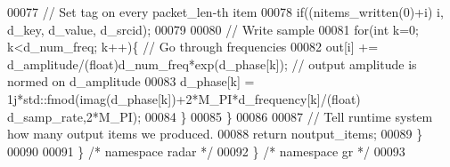 \begin{DoxyCode}
00077             \textcolor{comment}{// Set tag on every packet\_len-th item}
00078             \textcolor{keywordflow}{if}((nitems\_written(0)+i)%
      i, d_key, d_value, d_srcid);
00079             
00080             \textcolor{comment}{// Write sample}
00081             \textcolor{keywordflow}{for}(\textcolor{keywordtype}{int} k=0; k<d_num_freq; k++)\{ \textcolor{comment}{// Go through frequencies}
00082                 out[i] += d_amplitude/(float)d\_num\_freq*exp(d_phase[k]); \textcolor{comment}{// output amplitude is normed on
       d\_amplitude}
00083                 d_phase[k] = 1j*std::fmod(imag(d_phase[k])+2*M\_PI*d_frequency[k]/(\textcolor{keywordtype}{float})
      d_samp_rate,2*M\_PI);
00084             \}
00085         \}
00086 
00087         \textcolor{comment}{// Tell runtime system how many output items we produced.}
00088         \textcolor{keywordflow}{return} noutput\_items;
00089     \}
00090 
00091   \} \textcolor{comment}{/* namespace radar */}
00092 \} \textcolor{comment}{/* namespace gr */}
00093 
\end{DoxyCode}
